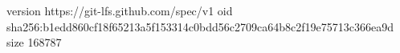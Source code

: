 version https://git-lfs.github.com/spec/v1
oid sha256:b1edd860cf18f65213a5f153314c0bdd56c2709ca64b8c2f19e75713c366ea9d
size 168787
